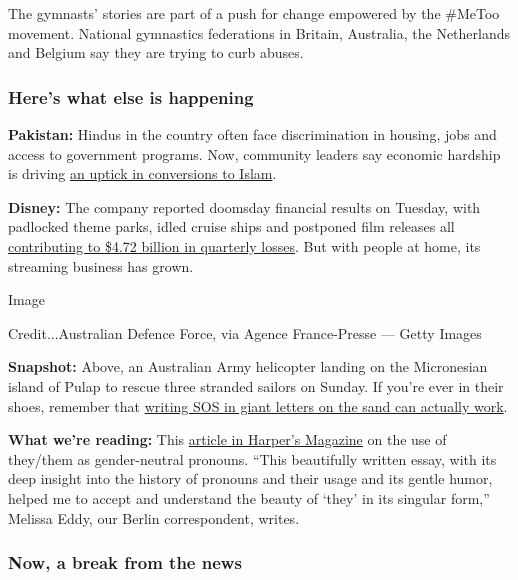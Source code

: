 The gymnasts' stories are part of a push for change empowered by the
\#MeToo movement. National gymnastics federations in Britain, Australia,
the Netherlands and Belgium say they are trying to curb abuses.

\hypertarget{heres-what-else-is-happening}{%
\subsubsection{Here's what else is
happening}\label{heres-what-else-is-happening}}

\textbf{Pakistan:} Hindus in the country often face discrimination in
housing, jobs and access to government programs. Now, community leaders
say economic hardship is driving
\href{https://www.nytimes3xbfgragh.onion/2020/08/04/world/asia/pakistan-hindu-conversion.html}{an
uptick in conversions to Islam}.

\textbf{Disney:} The company reported doomsday financial results on
Tuesday, with padlocked theme parks, idled cruise ships and postponed
film releases all
\href{https://www.nytimes3xbfgragh.onion/live/2020/08/04/business/stock-market-today-coronavirus\#disney-lost-4-7-billion-last-quarter-but-its-newest-business-was-a-big-hit}{contributing
to \$4.72 billion in quarterly losses}. But with people at home, its
streaming business has grown.

Image

Credit...Australian Defence Force, via Agence France-Presse --- Getty
Images

\textbf{Snapshot:} Above, an Australian Army helicopter landing on the
Micronesian island of Pulap to rescue three stranded sailors on Sunday.
If you're ever in their shoes, remember that
\href{https://www.nytimes3xbfgragh.onion/2020/08/04/world/australia/sos-pacific-island.html}{writing
SOS in giant letters on the sand can actually work}.

\textbf{What we're reading:} This
\href{https://harpers.org/archive/2020/08/all-my-pronouns-the-singular-they/}{article
in Harper's Magazine} on the use of they/them as gender-neutral
pronouns. ``This beautifully written essay, with its deep insight into
the history of pronouns and their usage and its gentle humor, helped me
to accept and understand the beauty of `they' in its singular form,''
Melissa Eddy, our Berlin correspondent, writes.

\hypertarget{now-a-break-from-the-news}{%
\subsubsection{Now, a break from the
news}\label{now-a-break-from-the-news}}

